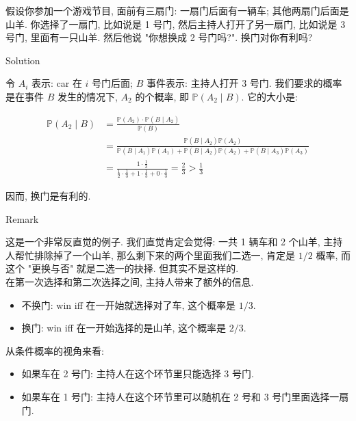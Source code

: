 \documentclass{qlnotes-export}
\begin{document}
\begin{example}

假设你参加一个游戏节目, 面前有三扇门: 一扇门后面有一辆车; 其他两扇门后面是山羊. 你选择了一扇门, 比如说是 1 号门, 然后主持人打开了另一扇门, 比如说是 3 号门, 里面有一只山羊. 然后他说 "你想换成 2 号门吗?". 换门对你有利吗?

\begin{qlsolution}{Solution}

令 \(A_{i}\) 表示: car 在 \(i\) 号门后面; \(B\) 事件表示: 主持人打开 3 号门. 我们要求的概率是在事件 \(B\) 发生的情况下, \(A_{2}\) 的个概率, 即 \({\mathbb{P}}(A_{2} \mid B)\). 它的大小是:

\[\begin{matrix}
{{\mathbb{P}}(A_{2} \mid B)} & {= \frac{{\mathbb{P}}(A_{2}) \cdot {\mathbb{P}}(B \mid A_{2})}{{\mathbb{P}}(B)}} \\
 & {= \frac{{\mathbb{P}}(B \mid A_{2}){\mathbb{P}}(A_{2})}{{\mathbb{P}}(B \mid A_{1}){\mathbb{P}}(A_{1}) + {\mathbb{P}}(B \mid A_{2}){\mathbb{P}}(A_{2}) + {\mathbb{P}}(B \mid A_{3}){\mathbb{P}}(A_{3})}} \\
 & {= \frac{1 \cdot \frac{1}{3}}{\frac{1}{2} \cdot \frac{1}{3} + 1 \cdot \frac{1}{3} + 0 \cdot \frac{1}{3}} = \frac{2}{3} > \frac{1}{3}}
\end{matrix}\]

因而, 换门是有利的.

\end{qlsolution}

\begin{qlremark}{Remark}

这是一个非常反直觉的例子. 我们直觉肯定会觉得: 一共 1 辆车和 2 个山羊, 主持人帮忙排除掉了一个山羊, 那么剩下来的两个里面我们二选一, 肯定是 \(1/2\) 概率, 而这个 "更换与否" 就是二选一的抉择. 但其实不是这样的.\\
在第一次选择和第二次选择之间, 主持人带来了额外的信息.

\begin{itemize}
\item
  不换门: win iff 在一开始就选择对了车, 这个概率是 \(1/3\).
\item
  换门: win iff 在一开始选择的是山羊, 这个概率是 \(2/3\).
\end{itemize}

从条件概率的视角来看:

\begin{itemize}
\item
  如果车在 2 号门: 主持人在这个环节里只能选择 3 号门.
\item
  如果车在 1 号门: 主持人在这个环节里可以随机在 2 号和 3 号门里面选择一扇门.
\end{itemize}


\end{qlremark}
\end{example}
\end{document}
